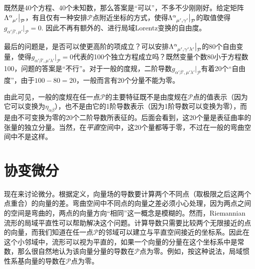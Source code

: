 既然是40个方程、40个未知数，那么答案是“可以”，不多不少刚刚好。给定矩阵$\Lambda\indices{^\alpha_{\mu'}} \big|_{\mathcal{P}}$，有且仅有一种安排$\mathcal{P}$点附近坐标的方式，使得$\Lambda\indices{^\alpha_{\mu' , \gamma'}} \big|_{\mathcal{P}}$的取值使得$g_{\alpha' \beta', \mu'} \big|_{\mathcal{P}} = 0.$ 因此不再有额外的、进行局域Lorentz变换的自由度。

最后的问题是，是否可以使更高阶的项成立？可以安排$\Lambda\indices{^\alpha_{\mu', \gamma' \lambda'}} \big|_{\mathcal{P}}$的80个自由变量，使得$g_{\alpha' \beta', \mu' \lambda'} \big|_{\mathcal{P}} = 0$代表的100个独立方程成立吗？既然变量个数80小于方程数100，问题的答案是“不行”。对于一般的度规，二阶导数$g_{\alpha' \beta', \mu' \lambda'} \big|_{\mathcal{P}}$有着20个“自由度”，由于$100 - 80 = 20$，一般而言有20个分量不能为零。

由此可见，一般的度规在任一点$\mathcal{P}$的主要特征既不是由度规在$\mathcal{P}$点的值表示（因为它可以变换为$\eta_{\alpha \beta}$），也不是由它的1阶导数表示（因为1阶导数可以变换为零），而是由不可变换为零的20个二阶导数所表征的。后面会看到，这20个量是表征曲率的张量的独立分量。当然，在\textit{平直}空间中，这20个量都等于零，不过在一般的弯曲空间中不是这样。


\section{协变微分}
\label{sec6.3}
现在来讨论微分。根据定义，向量场的导数要计算两个不同点（取极限之后这两个点重合）的向量的差。弯曲空间中不同点的向量之差必须小心处理，因为两点之间的空间是弯曲的，两点的向量方向“相同”这一概念是模糊的。然而，Riemannian流形的局域平直性可以帮助解决这个问题。计算导数只需要比较两个无限接近的点的向量，而我们知道在任一点$\mathcal{P}$的邻域可以建立与平直空间接近的坐标系。因此在这个小邻域中，流形可以视为平直的，如果一个向量的分量在这个坐标系中是常数，那么很自然地认为该向量分量的导数在$\mathcal{P}$点为零。例如，按这种说法，局域惯性系基向量的导数在$\mathcal{P}$点为零。

